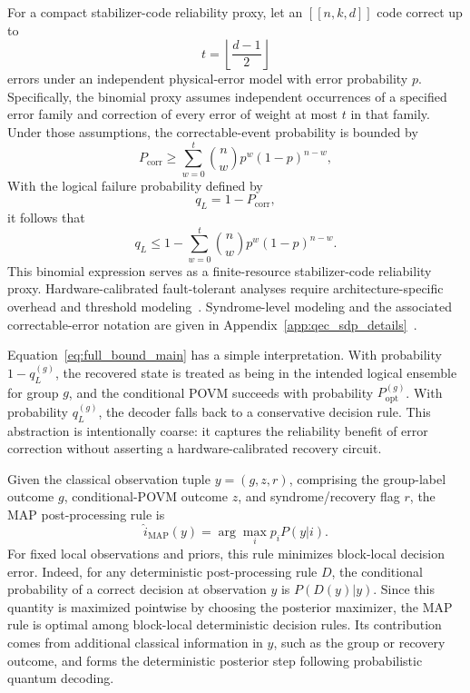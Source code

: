 \documentclass[
 reprint,
 amsmath,amssymb,
 aps,
 pra,
 floatfix,
]{revtex4-2}
\begin{document}
For a compact stabilizer-code reliability proxy, let an $[[n,k,d]]$ code correct up to
\begin{equation}
    t=\left\lfloor\frac{d-1}{2}\right\rfloor
    \label{eq:t_correct_main}
\end{equation}
errors under an independent physical-error model with error probability $p$. Specifically, the binomial proxy assumes independent occurrences of a specified error family and correction of every error of weight at most $t$ in that family. Under those assumptions, the correctable-event probability is bounded by
\begin{equation}
    P_{\mathrm{corr}}
    \ge
    \sum_{w=0}^{t}
    \binom{n}{w}p^w(1-p)^{n-w},
    \label{eq:pcorr_proxy_main}
\end{equation}
With the logical failure probability defined by
\begin{equation}
    q_L=1-P_{\mathrm{corr}},
    \label{eq:ql_definition_main}
\end{equation}
it follows that
\begin{equation}
    q_L
    \le
    1-
    \sum_{w=0}^{t}
    \binom{n}{w}p^w(1-p)^{n-w}.
    \label{eq:ql_proxy_main}
\end{equation}
This binomial expression serves as a finite-resource stabilizer-code reliability proxy. Hardware-calibrated fault-tolerant analyses require architecture-specific overhead and threshold modeling~\cite{fowler2012surface,terhal2015quantum,campbell2017roads}. Syndrome-level modeling and the associated correctable-error notation are given in Appendix~\ref{app:qec_sdp_details}~\cite{shor1995scheme,steane1996error,calderbank1996good,gottesman1997stabilizer,lidar2013quantum}.

Equation~\eqref{eq:full_bound_main} has a simple interpretation. With probability $1-q_L^{(g)}$, the recovered state is treated as being in the intended logical ensemble for group $g$, and the conditional POVM succeeds with probability $P_{\mathrm{opt}}^{(g)}$. With probability $q_L^{(g)}$, the decoder falls back to a conservative decision rule. This abstraction is intentionally coarse: it captures the reliability benefit of error correction without asserting a hardware-calibrated recovery circuit.

Given the classical observation tuple $y=(g,z,r)$, comprising the group-label outcome $g$, conditional-POVM outcome $z$, and syndrome/recovery flag $r$, the MAP post-processing rule is
\begin{equation}
    \hat i_{\mathrm{MAP}}(y)=\arg\max_i p_i P(y|i).
    \label{eq:map_rule_main}
\end{equation}
For fixed local observations and priors, this rule minimizes block-local decision error. Indeed, for any deterministic post-processing rule \(D\), the conditional probability of a correct decision at observation \(y\) is \(P(D(y)|y)\). Since this quantity is maximized pointwise by choosing the posterior maximizer, the MAP rule is optimal among block-local deterministic decision rules. Its contribution comes from additional classical information in $y$, such as the group or recovery outcome, and forms the deterministic posterior step following probabilistic quantum decoding.
\end{document}
